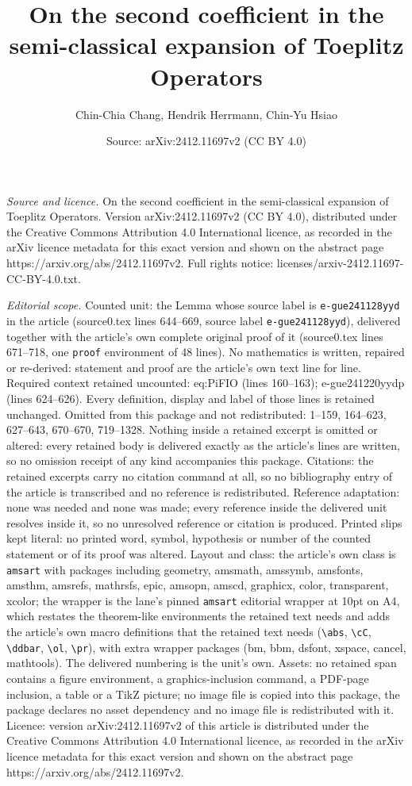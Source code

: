 \documentclass[10pt,a4paper]{amsart}
\title[On the second coefficient in the semi-classical expansion of]{On the second coefficient in the semi-classical expansion of Toeplitz Operators}
\author{Chin-Chia Chang, Hendrik Herrmann, Chin-Yu Hsiao}
\date{Source: arXiv:2412.11697v2 (CC BY 4.0)}
\begin{document}
\maketitle

\noindent\emph{Source and licence.} On the second coefficient in the semi-classical expansion of Toeplitz Operators. Version arXiv:2412.11697v2 (CC BY 4.0), distributed under the Creative Commons Attribution 4.0 International licence, as recorded in the arXiv licence metadata for this exact version and shown on the abstract page https://arxiv.org/abs/2412.11697v2. Full rights notice: licenses/arxiv-2412.11697-CC-BY-4.0.txt.\par\smallskip

\noindent\textit{Editorial scope.} Counted unit: the Lemma whose source label is \texttt{e-gue241128yyd} in the article (source0.tex lines 644--669, source label \texttt{e-gue241128yyd}), delivered together with the article's own complete original proof of it (source0.tex lines 671--718, one \texttt{proof} environment of 48 lines). No mathematics is written, repaired or re-derived: statement and proof are the article's own text line for line. Required context retained uncounted: eq:PiFIO (lines 160--163); e-gue241220yydp (lines 624--626). Every definition, display and label of those lines is retained unchanged. Omitted from this package and not redistributed: 1--159, 164--623, 627--643, 670--670, 719--1328. Nothing inside a retained excerpt is omitted or altered: every retained body is delivered exactly as the article's lines are written, so no omission receipt of any kind accompanies this package. Citations: the retained excerpts carry no citation command at all, so no bibliography entry of the article is transcribed and no reference is redistributed. Reference adaptation: none was needed and none was made; every reference inside the delivered unit resolves inside it, so no unresolved reference or citation is produced. Printed slips kept literal: no printed word, symbol, hypothesis or number of the counted statement or of its proof was altered. Layout and class: the article's own class is \texttt{amsart} with packages including geometry, amsmath, amssymb, amsfonts, amsthm, amsrefs, mathrsfs, epic, amsopn, amscd, graphicx, color, transparent, xcolor; the wrapper is the lane's pinned \texttt{amsart} editorial wrapper at 10pt on A4, which restates the theorem-like environments the retained text needs and adds the article's own macro definitions that the retained text needs (\texttt{\textbackslash abs}, \texttt{\textbackslash cC}, \texttt{\textbackslash ddbar}, \texttt{\textbackslash ol}, \texttt{\textbackslash pr}), with extra wrapper packages (bm, bbm, dsfont, xspace, cancel, mathtools). The delivered numbering is the unit's own. Assets: no retained span contains a figure environment, a graphics-inclusion command, a PDF-page inclusion, a table or a TikZ picture; no image file is copied into this package, the package declares no asset dependency and no image file is redistributed with it. Licence: version arXiv:2412.11697v2 of this article is distributed under the Creative Commons Attribution 4.0 International licence, as recorded in the arXiv licence metadata for this exact version and shown on the abstract page https://arxiv.org/abs/2412.11697v2. 
\end{document}
